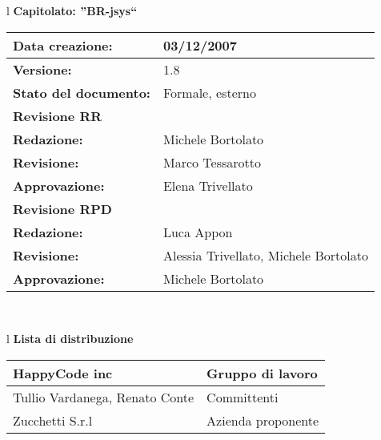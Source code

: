 

\newcommand{\lv}{ 1.8 } %
\newcommand{\dt}{ Glossario }%


\begin{center}
\thispagestyle{plain}
\begin{table}[htbp]
\large{
\begin{tabular}{l}
\Large{\textbf{\textsf{Capitolato: ''BR-jsys``}}} \\
\begin{tabular}{|p{6cm}|p{6cm}|}
\hline
\textbf{Data creazione:} & 03/12/2007 \\ \hline
\textbf{Versione:} & \lv \\ \hline
\textbf{Stato del documento:} & Formale, esterno \\ \hline
\textbf{Revisione RR} & \\ \hline
\textbf{Redazione:} & Michele Bortolato\\ \hline
\textbf{Revisione:} & Marco Tessarotto\\ \hline
\textbf{Approvazione:}  & Elena Trivellato\\ \hline
\textbf{Revisione RPD} & \\ \hline
\textbf{Redazione:} & Luca Appon \\ \hline
\textbf{Revisione:} & Alessia Trivellato, Michele Bortolato  \\ \hline
\textbf{Approvazione:}  & Michele Bortolato \\ \hline
\end{tabular} \\
\end{tabular}
}
\end{table}

\begin{table}[hbtp]
\large{
\begin{tabular}{l}
\Large{\textbf{\textsf{Lista di distribuzione}}} \\
\begin{tabular}{|p{6cm}|p{6cm}|} \hline
{HappyCode inc}& Gruppo di lavoro \\ \hline
{Tullio Vardanega, Renato Conte}& Committenti \\ \hline 
{Zucchetti S.r.l}& Azienda proponente\\ \hline
\end{tabular} \\
\end{tabular}
}
\end{table}
\begin{table}[hbtp]


\end{table}
\end{center}
